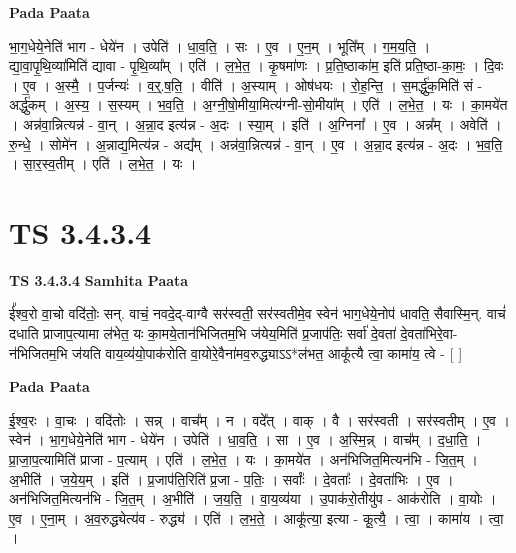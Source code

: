 \documentclass[17pt]{extarticle}
\begin{document}
\textbf{Pada Paata} \newline

भा॒ग॒धेये॒नेति॑ भाग - धेये॑न । उपेति॑ । धा॒व॒ति॒ । सः । ए॒व । ए॒न॒म् । भूति᳚म् । ग॒म॒य॒ति॒ । द्या॒वा॒पृ॒थि॒व्या॑मिति॑ द्यावा - पृ॒थि॒व्या᳚म् । एति॑ । ल॒भे॒त॒ । कृ॒षमा॑णः । प्र॒ति॒ष्ठाका॑म॒ इति॑ प्रति॒ष्ठा-का॒मः॒ । दि॒वः । ए॒व । अ॒स्मै॒ । प॒र्जन्यः॑ । व॒र्॒.ष॒ति॒ । वीति॑ । अ॒स्याम् । ओष॑धयः । रो॒ह॒न्ति॒ । स॒मर्द्धु॑क॒मिति॑ सं - अर्द्धु॑कम् । अ॒स्य॒ । स॒स्यम् । भ॒व॒ति॒ । अ॒ग्नी॒षो॒मीया॒मित्य॑ग्नी-सो॒मीया᳚म् । एति॑ । ल॒भे॒त॒ । यः । का॒मये॑त । अन्न॑वा॒न्नित्यन्न॑ - वा॒न् । अ॒न्ना॒द इत्य॑न्न - अ॒दः । स्या॒म् । इति॑ । अ॒ग्निना᳚ । ए॒व । अन्न᳚म् । अवेति॑ । रु॒न्धे॒ । सोमे॑न । अ॒न्नाद्य॒मित्य॑न्न - अद्य᳚म् । अन्न॑वा॒न्नित्यन्न॑ - वा॒न् । ए॒व । अ॒न्ना॒द इत्य॑न्न - अ॒दः । भ॒व॒ति॒ । सा॒र॒स्व॒तीम् । एति॑ । ल॒भे॒त॒ । यः ।  \newline





\section{ TS 3.4.3.4 }

\textbf{TS 3.4.3.4 } \newline
\textbf{Samhita Paata} \newline

ई᳚श्व॒रो वा॒चो वदि॑तोः॒ सन्. वाचं॒ नवदे॒द्-वाग्वै सर॑स्वती॒ सर॑स्वतीमे॒व स्वेन॑ भाग॒धेये॒नोप॑ धावति॒ सैवास्मि॒न्. वाचं॑ दधाति प्राजाप॒त्यामा ल॑भेत॒ यः का॒मये॒तान॑भिजितम॒भि ज॑येय॒मिति॑ प्र॒जाप॑तिः॒ सर्वा॑ दे॒वता॑ दे॒वता॑भिरे॒वा-न॑भिजितम॒भि ज॑यति वाय॒व्य॑यो॒पाक॑रोति वा॒योरे॒वैना॑मव॒रुद्ध्याऽऽ*ल॑भत॒ आकू᳚त्यै त्वा॒ कामा॑य॒ त्वे - [  ] \newline

\textbf{Pada Paata} \newline

ई॒श्व॒रः । वा॒चः । वदि॑तोः । सन्न् । वाच᳚म् । न । वदे᳚त् । वाक् । वै । सर॑स्वती । सर॑स्वतीम् । ए॒व । स्वेन॑ । भा॒ग॒धेये॒नेति॑ भाग - धेये॑न । उपेति॑ । धा॒व॒ति॒ । सा । ए॒व । अ॒स्मि॒न्न् । वाच᳚म् । द॒धा॒ति॒ । प्रा॒जा॒प॒त्यामिति॑ प्राजा - प॒त्याम् । एति॑ । ल॒भे॒त॒ । यः । का॒मये॑त । अन॑भिजित॒मित्यन॑भि - जि॒त॒म् । अ॒भीति॑ । ज॒ये॒य॒म् । इति॑ । प्र॒जाप॑ति॒रिति॑ प्र॒जा - प॒तिः॒ । सर्वाः᳚ । दे॒वताः᳚ । दे॒वता॑भिः । ए॒व । अन॑भिजित॒मित्यन॑भि - जि॒त॒म् । अ॒भीति॑ । ज॒य॒ति॒ । वा॒य॒व्य॑या । उ॒पाक॑रो॒तीयु॑प - आक॑रोति । वा॒योः । ए॒व । ए॒ना॒म् । अ॒व॒रुद्ध्येत्य॑व - रुद्ध्य॑ । एति॑ । ल॒भ॒ते॒ । आकू᳚त्या॒ इत्या - कू॒त्यै॒ । त्वा॒ । कामा॑य । त्वा॒ ।  \newline
\end{document}
